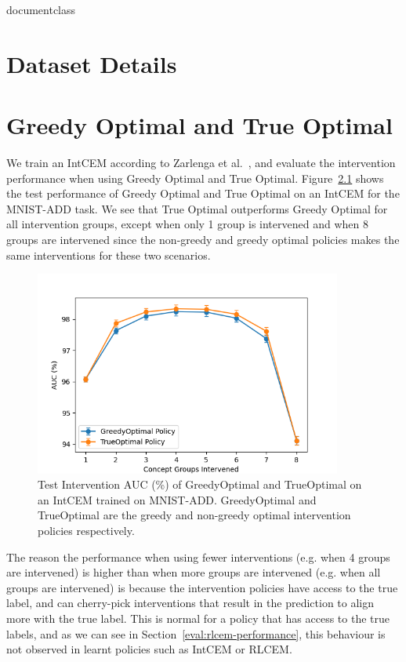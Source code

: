 \csname documentclass

\appendix

\chapter{Dataset Details}\label{appendix:datasets}

\chapter{Greedy Optimal and True Optimal}\label{appendix:optimal-policies}

We train an IntCEM according to Zarlenga et al.~\cite{intcem}, 
and evaluate the intervention performance when using
Greedy Optimal and True Optimal. 
Figure~\ref{fig:greedy-vs-optimal} shows the test performance of 
Greedy Optimal and True Optimal on an IntCEM for the 
MNIST-ADD task. We see that True Optimal outperforms 
Greedy Optimal for all intervention groups, except
when only 1 group is intervened and when 8 groups are intervened
since the non-greedy and greedy optimal policies 
makes the same interventions for these two scenarios. 

\begin{figure}[!h]
    \centering
    \includegraphics[width=0.9\textwidth]{figs/evaluation/greedy_vs_true_optimal.png}
    \caption{
        Test Intervention AUC (\%) of GreedyOptimal and TrueOptimal
        on an IntCEM trained on MNIST-ADD. GreedyOptimal and TrueOptimal are the greedy and non-greedy optimal intervention
        policies respectively.
    }
    \label{fig:greedy-vs-optimal}
\end{figure}

The reason the performance when using
fewer interventions (e.g. when 4 groups are intervened) is higher than
when more groups are intervened (e.g. when all groups are intervened)
is because the intervention policies have access to the true 
label, and can cherry-pick interventions that result in 
the prediction to align more with the true label. This is
normal for a policy that has access to the 
true labels, and as we can see in 
Section~\ref{eval:rlcem-performance}, this behaviour is not observed 
in learnt policies such as IntCEM or RLCEM.
